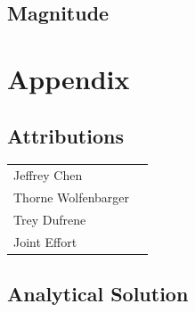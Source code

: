 \documentclass[12pt]{report}
\begin{document}
\begin{flushleft}
\subsection{Magnitude}

\section{Appendix} \label{appendix}
\subsection{Attributions}
\onehalfspacing
\begin{tabular}{ll}
Jeffrey Chen & \\
Thorne Wolfenbarger &\\
Trey Dufrene & \\
Joint Effort &
\end{tabular}
\singlespacing

\newpage
\subsection{Analytical Solution}

\newpage

\end{flushleft}
\end{document}
